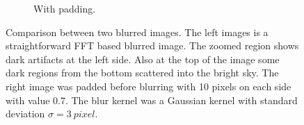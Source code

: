 \documentclass{juliacon}
\begin{document}
\begin{figure}[h]
\begin{subfigure}[b]{.25\textwidth}
            \centering
            \caption{With padding.}
            \label{fig:withpad}
        \end{subfigure}
        \caption{Comparison between two blurred images. The left images is a straightforward FFT based blurred image.
        The zoomed region shows dark artifacts at the left side. Also at the top of the image some dark regions from
        the bottom scattered into the bright sky.
        The right image was padded before blurring with 10 pixels on each side with value 0.7. The blur kernel was a Gaussian kernel
        with standard deviation $\sigma=\SI{3}{pixel}$.}
        \label{fig:}
    \end{figure}
     
\end{document}
